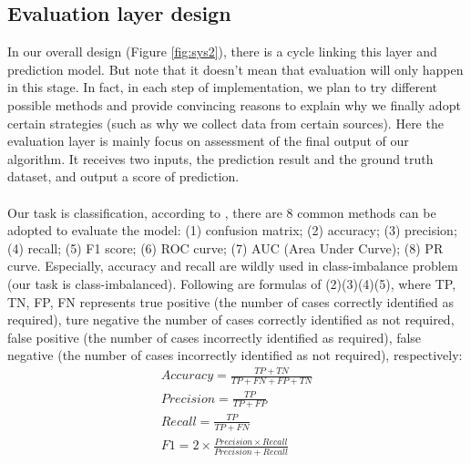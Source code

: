 \subsection{Evaluation layer design}
\label{sec:evaluation}
In our overall design (Figure \ref{fig:sys2}), there is a cycle linking this layer and prediction model. But note that it doesn't mean that evaluation will only happen in this stage. In fact, in each step of implementation, we plan to try different possible methods and provide convincing reasons to explain why we finally adopt certain strategies (such as why we collect data from certain sources). Here the evaluation layer is mainly focus on assessment of the final output of our algorithm. It receives two inputs, the prediction result and the ground truth dataset, and output a score of prediction. \\
\\Our task is classification, according to \cite{Chollet:2017:DLP:3203489}, there are 8 common methods can be adopted to evaluate the model: (1) confusion matrix; (2) accuracy; (3) precision; (4) recall; (5) F1 score; (6) ROC curve; (7) AUC (Area Under Curve); (8) PR curve. Especially, accuracy and recall are wildly used in class-imbalance problem (our task is class-imbalanced). Following are formulas of (2)(3)(4)(5), where TP, TN, FP, FN represents true positive (the number of cases correctly identified as required), ture negative the number of cases correctly identified as not required, false positive (the number of cases incorrectly identified as required), false negative (the number of cases incorrectly identified as not required), respectively:
\begin{displaymath}
    \begin{array}{c}
        Accuracy = \frac{TP+TN}{TP+FN+FP+TN} \\
        Precision = \frac{TP}{TP+FP}\\
        Recall = \frac{TP}{TP+FN}\\
        F1 = 2\times\frac{Precision \times Recall}{Precision + Recall}
    \end{array}
\end{displaymath}
